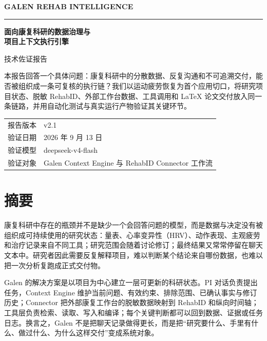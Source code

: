\documentclass[11pt,a4paper]{article}
\begin{document}
\begin{titlepage}
\thispagestyle{empty}
\vspace*{1.8cm}
{\sffamily\large\bfseries GALEN REHAB INTELLIGENCE\par}
\vspace{0.22cm}
\rule{\linewidth}{1.1pt}\par
\vspace{1.2cm}
{\fontsize{28}{36}\selectfont\bfseries
面向康复科研的数据治理与\\
项目上下文执行引擎\par}
\vspace{0.55cm}
{\Large 技术佐证报告\par}
\vspace{1.4cm}
\noindent\begin{minipage}{0.88\linewidth}
\large
本报告回答一个具体问题：康复科研中的分散数据、反复沟通和不可追溯交付，能否被组织成一条可复核的执行链？我们以运动疲劳恢复为首个应用切口，将研究项目状态、脱敏 RehabID、外部工作台数据、工具调用和 LaTeX 论文交付放入同一条链路，并用自动化测试与真实运行产物验证其关键环节。
\end{minipage}

\vfill
\begin{tabularx}{\linewidth}{@{}lY@{}}
\toprule
报告版本 & v2.1 \\
验证日期 & 2026 年 9 月 13 日 \\
验证模型 & deepseek-v4-flash \\
验证对象 & Galen Context Engine 与 RehabID Connector 工作流 \\
\bottomrule
\end{tabularx}
\vspace{0.9cm}
\end{titlepage}

\section*{摘要}
康复科研中存在的瓶颈并不是缺少一个会回答问题的模型，而是数据与决定没有被组织成可持续使用的研究状态：量表、心率变异性（HRV）、动作表现、主观疲劳和治疗记录来自不同工具；研究范围会随着讨论修订；最终结果又常常停留在聊天文本中。研究者因此需要反复解释项目，难以判断某个结论来自哪份数据，也难以把一次分析复跑成正式交付物。

Galen 的解决方案是以项目为中心建立一层可更新的科研状态。PI 对话负责提出任务，Context Engine 维护当前问题、有效约束、排除范围、已确认事实与修订历史；Connector 把外部康复工作台的脱敏数据映射到 RehabID 和纵向时间轴；工具层负责检索、读取、写入和编译；每个关键判断都可以回到数据、证据或任务日志。换言之，Galen 不是把聊天记录做得更长，而是把“研究要什么、手里有什么、做过什么、为什么这样交付”变成系统对象。
\end{document}

